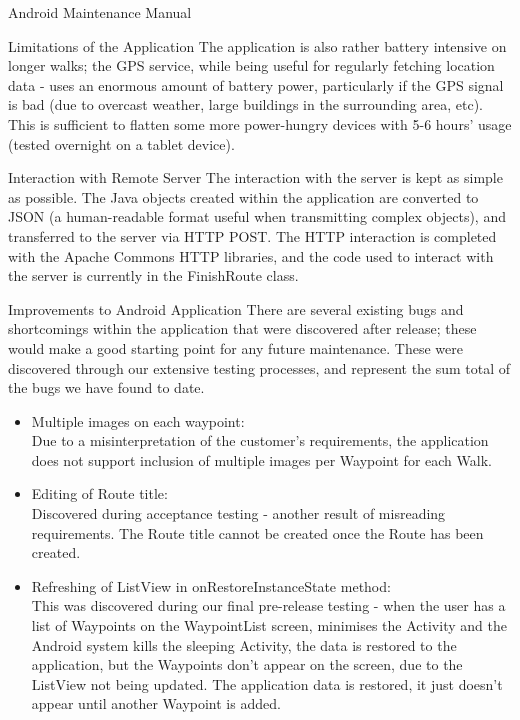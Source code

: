 \documentclass{article}
\begin{document}
\begin{section}{Android Maintenance Manual}
\begin{subsection}{Limitations of the Application}
		The application is also rather battery intensive on longer walks; the GPS service, while being useful for regularly fetching location data - uses an enormous amount of battery power, particularly if the GPS signal is bad (due to overcast weather, large buildings in the surrounding area, etc). This is sufficient to flatten some more power-hungry devices with 5-6 hours' usage (tested overnight on a tablet device).
	\end{subsection}
	
	\begin{subsection}{Interaction with Remote Server}
		The interaction with the server is kept as simple as possible. The Java objects created within the application are converted to JSON (a human-readable format useful when transmitting complex objects), and transferred to the server via HTTP POST. The HTTP interaction is completed with the Apache Commons HTTP libraries, and the code used to interact with the server is currently in the FinishRoute class.
	\end{subsection}
	
	\newpage
	\begin{subsection}{Improvements to Android Application}
		There are several existing bugs and shortcomings within the application that were discovered after release; these would make a good starting point for any future maintenance. These were discovered through our extensive testing processes, and represent the sum total of the bugs we have found to date.
		
		\begin{itemize}
			\item{Multiple images on each waypoint: \\
			Due to a misinterpretation of the customer's requirements, the application does not support inclusion of multiple images per Waypoint for each Walk.}
			
			\item{Editing of Route title: \\
			Discovered during acceptance testing - another result of misreading requirements. The Route title cannot be created once the Route has been created.}
			
			\item{Refreshing of ListView in onRestoreInstanceState method: \\
			This was discovered during our final pre-release testing - when the user has a list of Waypoints on the WaypointList screen, minimises the Activity and the Android system kills the sleeping Activity, the data is restored to the application, but the Waypoints don't appear on the screen, due to the ListView not being updated. The application data is restored, it just doesn't appear until another Waypoint is added.}
		\end{itemize}
	\end{subsection}
	

\end{section}
\end{document}
